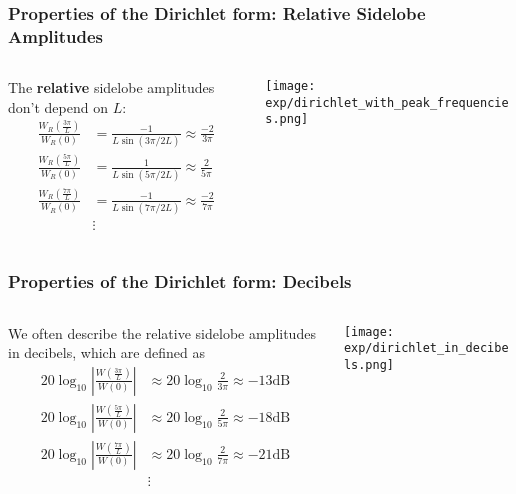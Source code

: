\documentclass{beamer}
\begin{document}
\begin{frame}
  \frametitle{Properties of the Dirichlet form: Relative Sidelobe Amplitudes}

  \begin{columns}
    \begin{column}{0.5\textwidth}

      The {\bf relative} sidelobe amplitudes don't depend on $L$:
      \begin{align*}      
        \frac{W_R\left(\frac{3\pi}{L}\right)}{W_R(0)} &=
        \frac{-1}{L\sin(3\pi/2L)}\approx \frac{-2}{3\pi}\\
        \frac{W_R\left(\frac{5\pi}{L}\right)}{W_R(0)} &=
        \frac{1}{L\sin(5\pi/2L)}\approx \frac{2}{5\pi}\\
        \frac{W_R\left(\frac{7\pi}{L}\right)}{W_R(0)} &=
        \frac{-1}{L\sin(7\pi/2L)}\approx \frac{-2}{7\pi}\\
        & \vdots
      \end{align*}
    \end{column}
    \begin{column}{0.5\textwidth}
      \centerline{\texttt{[image: exp/dirichlet\_with\_peak\_frequencies.png]}}
    \end{column}
  \end{columns}
\end{frame}

\begin{frame}
  \frametitle{Properties of the Dirichlet form: Decibels}
  \begin{columns}
    \begin{column}{0.5\textwidth}

      We often describe the relative sidelobe amplitudes in decibels,
      which are defined as
      \begin{align*}      
        20\log_{10}\left|\frac{W\left(\frac{3\pi}{L}\right)}{W(0)}\right| &\approx
        20\log_{10}\frac{2}{3\pi}\approx -13\mbox{dB}\\
        20\log_{10}\left|\frac{W\left(\frac{5\pi}{L}\right)}{W(0)}\right| &\approx
        20\log_{10}\frac{2}{5\pi}\approx -18\mbox{dB}\\
        20\log_{10}\left|\frac{W\left(\frac{7\pi}{L}\right)}{W(0)}\right| &\approx
        20\log_{10}\frac{2}{7\pi}\approx -21\mbox{dB}\\
        & \vdots
      \end{align*}
    \end{column}
    \begin{column}{0.5\textwidth}
      \centerline{\texttt{[image: exp/dirichlet\_in\_decibels.png]}}
    \end{column}
  \end{columns}
\end{frame}
\end{document}
